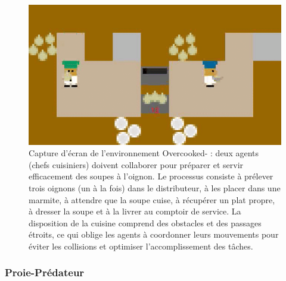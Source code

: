 \begin{figure}[h!]
  \centering
  \includegraphics[trim=0cm -0.5cm 0cm -0.5cm, clip, width=0.6\linewidth]{figures/overcooked.png}
  \caption{Capture d'écran de l'environnement Overcooked- : deux agents (chefs cuisiniers) doivent collaborer pour préparer et servir efficacement des soupes à l'oignon. Le processus consiste à prélever trois oignons (un à la fois) dans le distributeur, à les placer dans une marmite, à attendre que la soupe cuise, à récupérer un plat propre, à dresser la soupe et à la livrer au comptoir de service. La disposition de la cuisine comprend des obstacles et des passages étroits, ce qui oblige les agents à coordonner leurs mouvements pour éviter les collisions et optimiser l'accomplissement des tâches.}
  \label{fig:overcooked}
\end{figure}

\subsubsection*{Proie-Prédateur}

